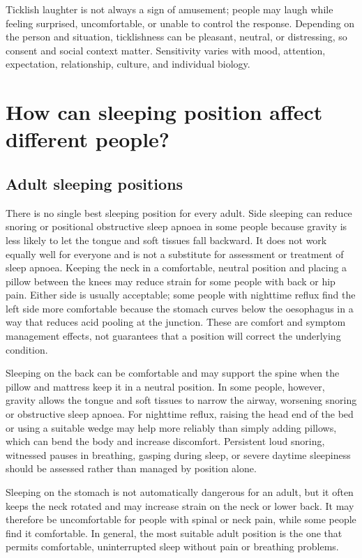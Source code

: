 \documentclass[11pt,oneside]{report}
\begin{document}
Ticklish laughter is not always a sign of amusement; people may laugh while
feeling surprised, uncomfortable, or unable to control the response. Depending
on the person and situation, ticklishness can be pleasant, neutral, or
distressing, so consent and social context matter. Sensitivity varies with
mood, attention, expectation, relationship, culture, and individual biology.

\section{How can sleeping position affect different people?}

\subsection*{Adult sleeping positions}

There is no single best sleeping position for every adult. Side sleeping can
reduce snoring or positional obstructive sleep apnoea in some people because
gravity is less likely to let the tongue and soft tissues fall backward. It does
not work equally well for everyone and is not a substitute for assessment or
treatment of sleep apnoea. Keeping the neck in a comfortable, neutral position
and placing a pillow between the knees may reduce strain for some people with
back or hip pain. Either side is usually acceptable; some people with nighttime
reflux find the left side more comfortable because the stomach curves below the
oesophagus in a way that reduces acid pooling at the junction. These are comfort
and symptom management effects, not guarantees that a position will correct the
underlying condition.

Sleeping on the back can be comfortable and may support the spine when the
pillow and mattress keep it in a neutral position. In some people, however,
gravity allows the tongue and soft tissues to narrow the airway, worsening
snoring or obstructive sleep apnoea. For nighttime reflux, raising the head end
of the bed or using a suitable wedge may help more reliably than simply adding
pillows, which can bend the body and increase discomfort. Persistent loud
snoring, witnessed pauses in breathing, gasping during sleep, or severe daytime
sleepiness should be assessed rather than managed by position alone.

Sleeping on the stomach is not automatically dangerous for an adult, but it
often keeps the neck rotated and may increase strain on the neck or lower back.
It may therefore be uncomfortable for people with spinal or neck pain, while
some people find it comfortable. In general, the most suitable adult position
is the one that permits comfortable, uninterrupted sleep without pain or
breathing problems.
\end{document}
